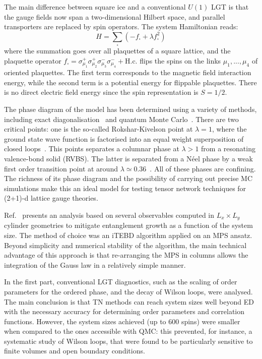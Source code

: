 \documentclass[epj,final]{svjour}
\begin{document}
The main difference between square ice and a conventional $U(1)$ LGT is that the gauge fields now span a two-dimensional Hilbert space, and parallel transporters are replaced by spin operators. The system Hamiltonian reads:
\begin{equation}
H = \sum_{\square} {\left( -f_\square + \lambda f_\square^2 \right)}
\label{eq:hamiltonian}
\end{equation}
where the summation goes over all plaquettes of a square lattice, and the plaquette operator $f_\square = \sigma_{\mu_1}^+ \sigma_{\mu_2}^+ \sigma_{\mu_3}^- \sigma_{\mu_4}^- + \mathrm{H.c.}$ flips the spins on the links  $\mu_1,...,\mu_4$ of oriented plaquettes. The first term corresponds to the magnetic field interaction energy, while the second term is a potential energy for flippable plaquettes. There is no direct electric field energy since the spin representation is $S=1/2$.

The phase diagram of the model has been determined using a variety of methods, including exact diagonalisation~\cite{Shannon2004CyclicExchangeXXZ} and quantum Monte Carlo~\cite{Banerjee2013QuantumLinkDeconfined}. There are two critical points: one is the so-called Rokshar-Kivelson point at $\lambda=1$, where the ground state wave function is factorised into an equal weight superposition of closed loops~\cite{Rokhsar1988Dimers}. This points separates a columnar phase at $\lambda>1$ from a resonating valence-bond solid (RVBS). The latter is separated from a N\'eel phase by a weak first order transition point at around $\lambda\simeq0.36$~\cite{Shannon2004CyclicExchangeXXZ,Banerjee2013QuantumLinkDeconfined}. All of these phases are confining. The richness of its phase diagram and the possibility of carrying out precise MC simulations make this an ideal model for testing tensor network techniques for (2+1)-d lattice gauge theories.

Ref.~\cite{tschirsich2019phase} presents an analysis based on several observables computed in $L_x\times L_y$ cylinder geometries to mitigate entanglement growth as a function of the system size. The method of choice was an iTEBD algorithm applied on an MPS ansatz. Beyond simplicity and numerical stability of the algorithm, the main technical advantage of this approach is that re-arranging the MPS in columns allows the integration of the Gauss law in a relatively simple manner.

In the first part, conventional LGT diagnostics, such as the scaling of order parameters for the ordered phase, and the decay of Wilson loops, were analysed. The main conclusion is that TN methods can reach system sizes well beyond ED with the necessary accuracy for determining order parameters and correlation functions. However, the system sizes achieved (up to 600 spins) were smaller when compared to the ones accessible with QMC: this prevented, for instance, a systematic study of Wilson loops, that were found to be particularly sensitive to finite volumes and open boundary conditions.
\end{document}
